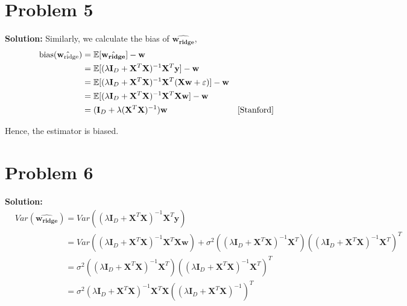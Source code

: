 \documentclass[11pt]{article}
\begin{document}
\section*{Problem 5}
\textbf{Solution:} Similarly, we calculate the bias of $\hat{\mathbf{w_{\text{ridge}}}}$, 
\begin{align}
	&\text{bias}(\hat{\mathbf{w_{\text{ridge}}}}) = \mathbb{E}[\hat{\mathbf{w_{ridge}}}] - \mathbf{w}\nonumber\\
	&\phantom{\text{bias}(\hat{\mathbf{w_{\text{ridge}}}})} = \mathbb{E}[(\lambda \mathbf{I}_D + \mathbf{X}^T\mathbf{X})^{-1}\mathbf{X}^T\mathbf{y}] - \mathbf{w}\nonumber\\
	&\phantom{\text{bias}(\hat{\mathbf{w_{\text{ridge}}}})} = \mathbb{E}[(\lambda \mathbf{I}_D + \mathbf{X}^T\mathbf{X})^{-1}\mathbf{X}^T(\mathbf{Xw} + \varepsilon)] - \mathbf{w}\nonumber\\
	&\phantom{\text{bias}(\hat{\mathbf{w_{\text{ridge}}}})} = \mathbb{E}[(\lambda \mathbf{I}_D + \mathbf{X}^T\mathbf{X})^{-1}\mathbf{X}^T\mathbf{Xw}] - \mathbf{w}\nonumber\\
	&\phantom{\text{bias}(\hat{\mathbf{w_{\text{ridge}}}})} = (\mathbf{I}_D + \lambda (\mathbf{X}^T\mathbf{X})^{-1})\mathbf{w} & \cite{Stanford}\nonumber
\end{align}

Hence, the estimator is biased.
\section*{Problem 6}
\textbf{Solution:}
\begin{align}
	&Var(\hat{\mathbf{w_{\text{ridge}}}}) = Var(( \lambda \mathbf{I}_D + \mathbf{X}^T\mathbf{X})^{-1}\mathbf{X}^T\mathbf{y})\nonumber\\
	&\phantom{Var(\hat{\mathbf{w_{\text{ridge}}}})} = Var(( \lambda \mathbf{I}_D + \mathbf{X}^T\mathbf{X})^{-1}\mathbf{X}^T\mathbf{Xw}) + \sigma^2(( \lambda \mathbf{I}_D + \mathbf{X}^T\mathbf{X})^{-1}\mathbf{X}^T)(( \lambda \mathbf{I}_D + \mathbf{X}^T\mathbf{X})^{-1}\mathbf{X}^T)^T\nonumber\\
	&\phantom{Var(\hat{\mathbf{w_{\text{ridge}}}})} = \sigma^2(( \lambda \mathbf{I}_D + \mathbf{X}^T\mathbf{X})^{-1}\mathbf{X}^T)(( \lambda \mathbf{I}_D + \mathbf{X}^T\mathbf{X})^{-1}\mathbf{X}^T)^T\nonumber\\
	&\phantom{Var(\hat{\mathbf{w_{\text{ridge}}}})} = \sigma^2( \lambda \mathbf{I}_D + \mathbf{X}^T\mathbf{X})^{-1}\mathbf{X}^T\mathbf{X}((\lambda \mathbf{I}_D + \mathbf{X}^T\mathbf{X})^{-1})^{T}\nonumber
\end{align}
\end{document}
